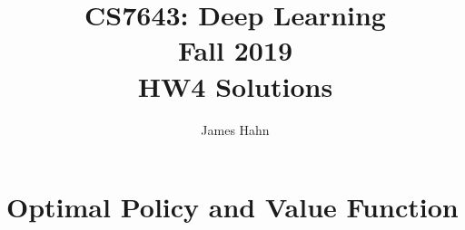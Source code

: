 \documentclass[11pt,english]{article}
\begin{document}
\title{CS7643: Deep Learning \\
Fall 2019\\ HW4 Solutions}
\author{James Hahn}
\maketitle

\setcounter{MaxMatrixCols}{25}
\setlength\arraycolsep{1pt}


\section{Optimal Policy and Value Function}
\end{document}

